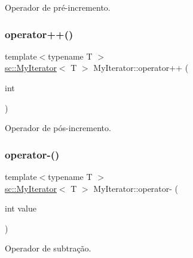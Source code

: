 Operador de pré-\/incremento. 

\mbox{\label{classsc_1_1MyIterator_a8643ca063ca14a2ed88a56f77b3033aa}} 
\subsubsection{\texorpdfstring{operator++()}{operator++()}\hspace{0.1cm}{\footnotesize\ttfamily [2/2]}}
{\footnotesize\ttfamily template$<$typename T $>$ \\
\hyperlink{classsc_1_1MyIterator}{sc\+::\+My\+Iterator}$<$ T $>$ My\+Iterator\+::operator++ (\begin{DoxyParamCaption}\item[{int}]{ }\end{DoxyParamCaption})}



Operador de pós-\/incremento. 

\mbox{\label{classsc_1_1MyIterator_a8e2ffa4f2a06d9377238bccb8954b2c0}} 
\subsubsection{\texorpdfstring{operator-\/()}{operator-()}\hspace{0.1cm}{\footnotesize\ttfamily [1/2]}}
{\footnotesize\ttfamily template$<$typename T $>$ \\
\hyperlink{classsc_1_1MyIterator}{sc\+::\+My\+Iterator}$<$ T $>$ My\+Iterator\+::operator-\/ (\begin{DoxyParamCaption}\item[{int}]{value }\end{DoxyParamCaption})}



Operador de subtração. 

\mbox{\label{classsc_1_1MyIterator_a52b15847aa07311fb00a27cff3cbfca2}} 
